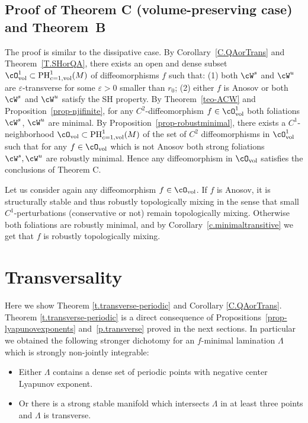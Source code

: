 \documentclass[a4paper,11pt]{amsart}
\numberwithin{equation}{section}     %
\theoremstyle{definition}
\theoremstyle{remark}
\DeclareMathOperator{\PH}{PH}
\begin{document}
\subsection{Proof of Theorem C (volume-preserving case) and Theorem~B}
The proof is similar to the dissipative case. By Corollary~\ref{C.QAorTrans} and Theorem~\ref{T.SHorQA}, there exists an open and dense subset $\cO^1_\mathrm{vol}\subset \PH^1_{c=1, \mathrm{vol}}(M)$ of diffeomorphisms $f$ such that: (1) both $\cW^s$ and $\cW^u$ are $\varepsilon$-transverse
for some $\varepsilon>0$ smaller than $r_0$; (2) either $f$ is Anosov or both $\cW^s$ and $\cW^u$ satisfy the SH property. By Theorem~\ref{teo-ACW} and Proposition~\ref{prop-njifinite}, for any $C^2$-diffeomorphism $f\in \cO^1_\mathrm{vol}$
both foliations $\cW^s$, $\cW^u$ are minimal. By Proposition~\ref{prop-robustminimal}, there exists a $C^1$-neighborhood $\cO_\mathrm{vol}\subset \PH^1_{c=1, \mathrm{vol}}(M)$ of the set of $C^2$ diffeomorphisms in $\cO^1_\mathrm{vol}$ such that for any $f\in \cO_\mathrm{vol}$ which is not Anosov both strong foliations $\cW^s,\cW^u$ are robustly minimal. Hence any diffeomorphism in $\cO_\mathrm{vol}$ satisfies the conclusions of Theorem C.

Let us consider again any diffeomorphism $f\in \cO_\mathrm{vol}$.
If $f$ is Anosov, it is structurally stable and thus robustly topologically mixing in the sense that small $C^1$-perturbations (conservative or not) remain topologically mixing.
Otherwise both foliations are robustly minimal, and by Corollary~\ref{c.minimaltransitive} we get that $f$ is robustly topologically mixing.


\section{Transversality}\label{s.transverse}

Here we show Theorem \ref{t.transverse-periodic} and Corollary \ref{C.QAorTrans}.
Theorem \ref{t.transverse-periodic} is a direct consequence of Propositions~\ref{prop-lyapunovexponents} and~\ref{p.transverse} proved in the next sections. In particular we obtained the following stronger dichotomy for an $f$-minimal lamination $\Lambda$ which is strongly non-jointly integrable:

\begin{itemize}
\item Either $\Lambda$ contains a dense set of periodic points with negative center Lyapunov exponent.
\item Or there is a strong stable manifold which intersects $\Lambda$ in at least three points and $\Lambda$ is transverse. 
\end{itemize}
\end{document}
